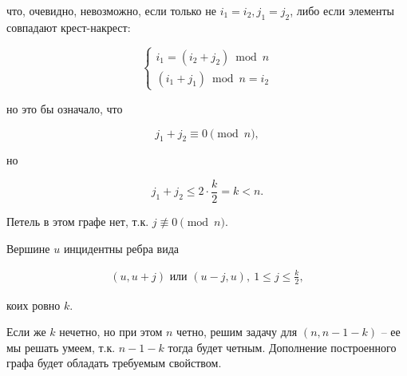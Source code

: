 \documentclass{article}
\begin{document}
	что, очевидно, невозможно, если только не $i_1 = i_2, j_1 = j_2$, либо если элементы совпадают крест-накрест:

	\begin{equation*}
		\begin{cases}
			i_1 = (i_2+j_2) \bmod n \\
			(i_1+j_1) \bmod n = i_2
		\end{cases}
	\end{equation*}

	но это бы означало, что

	\begin{equation*}
		j_1 + j_2 \equiv 0 \pmod n,
	\end{equation*}

	но

	\begin{equation*}
		j_1 + j_2 \le 2 \cdot \frac{k}{2} = k < n.
	\end{equation*}

	Петель в этом графе нет, т.к. $j \not\equiv 0 \pmod n$.

	Вершине $u$ инцидентны ребра вида 

	\begin{gather*}
		(u, u+j) \text{ или } (u-j, u), \ 1 \le j \le \frac{k}{2},
	\end{gather*}

	коих ровно $k$.

	Если же $k$ нечетно, но при этом $n$ четно, решим задачу для $(n, n-1-k)$ -- ее мы решать умеем, т.к. $n-1-k$ тогда будет четным. Дополнение построенного графа будет обладать требуемым свойством.




\end{document}
